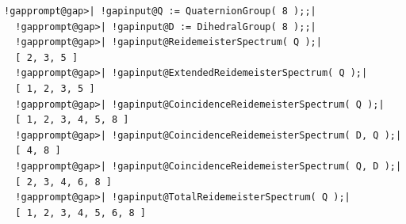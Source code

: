 \documentclass[a4paper,11pt]{report}
\begin{document}
{{{ 

 }

 
\begin{Verbatim}[commandchars=!@|,fontsize=\small,frame=single,label=Example]
  !gapprompt@gap>| !gapinput@Q := QuaternionGroup( 8 );;|
  !gapprompt@gap>| !gapinput@D := DihedralGroup( 8 );;|
  !gapprompt@gap>| !gapinput@ReidemeisterSpectrum( Q );|
  [ 2, 3, 5 ]
  !gapprompt@gap>| !gapinput@ExtendedReidemeisterSpectrum( Q );|
  [ 1, 2, 3, 5 ]
  !gapprompt@gap>| !gapinput@CoincidenceReidemeisterSpectrum( Q );|
  [ 1, 2, 3, 4, 5, 8 ]
  !gapprompt@gap>| !gapinput@CoincidenceReidemeisterSpectrum( D, Q );|
  [ 4, 8 ]
  !gapprompt@gap>| !gapinput@CoincidenceReidemeisterSpectrum( Q, D );|
  [ 2, 3, 4, 6, 8 ]
  !gapprompt@gap>| !gapinput@TotalReidemeisterSpectrum( Q );|
  [ 1, 2, 3, 4, 5, 6, 8 ]
\end{Verbatim}
 }

 }

   
\end{document}
